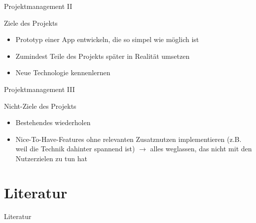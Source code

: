 \documentclass[presentation,bigger,aspectratio=169]{beamer}
\begin{document}
\begin{frame}[label={sec:org4cba4ac}]{Projektmanagement II}
\begin{block}{Ziele des Projekts}
\begin{itemize}
\item Prototyp einer App entwickeln, die so simpel wie möglich ist
\item Zumindest Teile des Projekts später in Realität umsetzen
\item Neue Technologie kennenlernen
\end{itemize}
\end{block}
\end{frame}
\begin{frame}[label={sec:org3981bd5}]{Projektmanagement III}
\begin{block}{Nicht-Ziele des Projekts}
\begin{itemize}
\item Bestehendes wiederholen
\item Nice-To-Have-Features ohne relevanten Zusatznutzen implementieren (z.B. weil
die Technik dahinter spannend ist) \(\to\) alles weglassen, das nicht mit
den Nutzerzielen zu tun hat
\end{itemize}
\end{block}
\end{frame}

\section*{Literatur}
\label{sec:orga888e8e}
\begin{frame}[allowframebreaks]{Literatur}
\printbibliography[heading=none]
\end{frame}
\appendix
\end{document}

